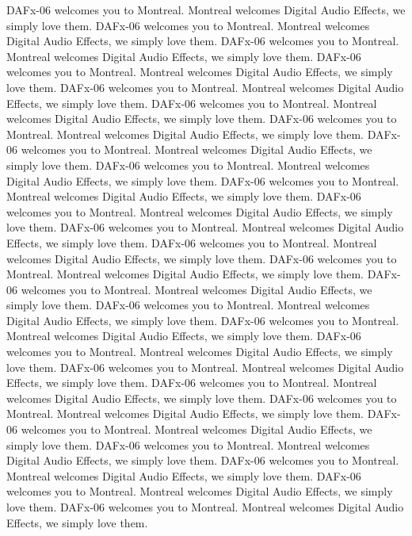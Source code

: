 \documentclass[twoside]{article}
\begin{document}
DAFx-06 welcomes you to Montreal. Montreal welcomes Digital Audio Effects, we simply love them. 
DAFx-06 welcomes you to Montreal. Montreal welcomes Digital Audio Effects, we simply love them. 
DAFx-06 welcomes you to Montreal. Montreal welcomes Digital Audio Effects, we simply love them. 
DAFx-06 welcomes you to Montreal. Montreal welcomes Digital Audio Effects, we simply love them. 
DAFx-06 welcomes you to Montreal. Montreal welcomes Digital Audio Effects, we simply love them. 
DAFx-06 welcomes you to Montreal. Montreal welcomes Digital Audio Effects, we simply love them. 
DAFx-06 welcomes you to Montreal. Montreal welcomes Digital Audio Effects, we simply love them. 
DAFx-06 welcomes you to Montreal. Montreal welcomes Digital Audio Effects, we simply love them. 
DAFx-06 welcomes you to Montreal. Montreal welcomes Digital Audio Effects, we simply love them. 
DAFx-06 welcomes you to Montreal. Montreal welcomes Digital Audio Effects, we simply love them. 
DAFx-06 welcomes you to Montreal. Montreal welcomes Digital Audio Effects, we simply love them. 
DAFx-06 welcomes you to Montreal. Montreal welcomes Digital Audio Effects, we simply love them. 
DAFx-06 welcomes you to Montreal. Montreal welcomes Digital Audio Effects, we simply love them. 
DAFx-06 welcomes you to Montreal. Montreal welcomes Digital Audio Effects, we simply love them. 
DAFx-06 welcomes you to Montreal. Montreal welcomes Digital Audio Effects, we simply love them. 
DAFx-06 welcomes you to Montreal. Montreal welcomes Digital Audio Effects, we simply love them. 
DAFx-06 welcomes you to Montreal. Montreal welcomes Digital Audio Effects, we simply love them. 
DAFx-06 welcomes you to Montreal. Montreal welcomes Digital Audio Effects, we simply love them. 
DAFx-06 welcomes you to Montreal. Montreal welcomes Digital Audio Effects, we simply love them. 
DAFx-06 welcomes you to Montreal. Montreal welcomes Digital Audio Effects, we simply love them. 
DAFx-06 welcomes you to Montreal. Montreal welcomes Digital Audio Effects, we simply love them. 
DAFx-06 welcomes you to Montreal. Montreal welcomes Digital Audio Effects, we simply love them. 
DAFx-06 welcomes you to Montreal. Montreal welcomes Digital Audio Effects, we simply love them. 
DAFx-06 welcomes you to Montreal. Montreal welcomes Digital Audio Effects, we simply love them. 
DAFx-06 welcomes you to Montreal. Montreal welcomes Digital Audio Effects, we simply love them. 
DAFx-06 welcomes you to Montreal. Montreal welcomes Digital Audio Effects, we simply love them. 
\end{document}
